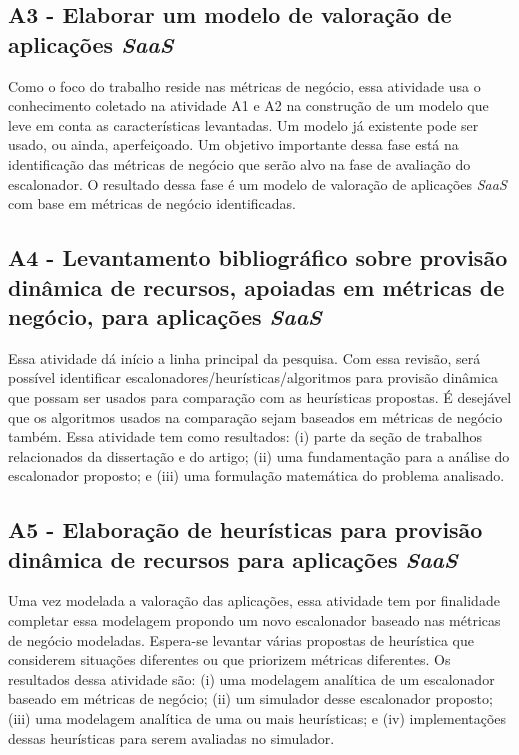 \documentclass[a4paper,titlepage,12pt]{article}
\begin{document}
\subsection*{A3 - Elaborar um modelo de valoração de aplicações \textit{SaaS}}
Como o foco do trabalho reside nas métricas de negócio, essa atividade usa o conhecimento coletado na atividade A1 e A2 na construção de um modelo que leve em conta as características levantadas. Um modelo já existente pode ser usado, ou ainda, aperfeiçoado. Um objetivo importante dessa fase está na identificação das métricas de negócio que serão alvo na fase de avaliação do escalonador. O resultado dessa fase é um modelo de valoração de aplicações \textit{SaaS} com base em métricas de negócio identificadas.

\subsection*{A4 - Levantamento bibliográfico sobre provisão dinâmica de recursos, apoiadas em métricas de negócio, para aplicações \textit{SaaS}}
Essa atividade dá início a linha principal da pesquisa. Com essa revisão, será possível identificar escalonadores/heurísticas/algoritmos para provisão dinâmica que possam ser usados para comparação com as heurísticas propostas. É desejável que os algoritmos usados na comparação sejam baseados em métricas de negócio também. Essa atividade tem como resultados: (i) parte da seção de trabalhos relacionados da dissertação e do artigo; (ii) uma fundamentação para a análise do escalonador proposto; e (iii) uma formulação matemática do problema analisado.

\subsection*{A5 - Elaboração de heurísticas para provisão dinâmica de recursos para aplicações \textit{SaaS}}
Uma vez modelada a valoração das aplicações, essa atividade tem por finalidade completar essa modelagem propondo um novo escalonador baseado nas métricas de negócio modeladas. Espera-se levantar várias propostas de heurística que considerem situações diferentes ou que priorizem métricas diferentes. Os resultados dessa atividade são: (i) uma modelagem analítica de um escalonador baseado em métricas de negócio; (ii) um simulador desse escalonador proposto; (iii) uma modelagem analítica de uma ou mais heurísticas; e (iv) implementações dessas heurísticas para serem avaliadas no simulador. 
\end{document}
